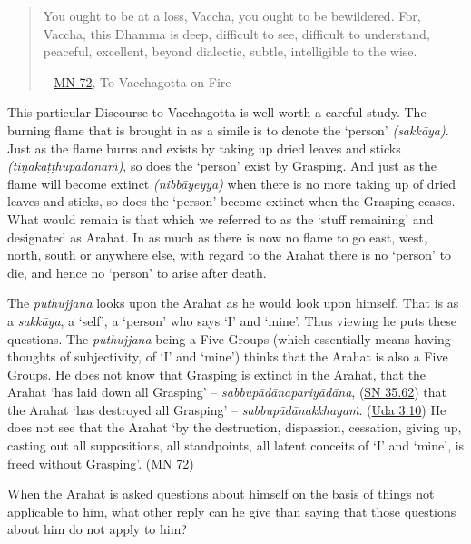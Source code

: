 \begin{quote}
You ought to be at a loss, Vaccha, you ought to be bewildered. For, Vaccha, this Dhamma is deep, difficult to see, difficult to understand, peaceful, excellent, beyond dialectic, subtle, intelligible to the wise.

 -- \href{https://suttacentral.net/mn72/en/thanissaro}{MN 72}, To Vacchagotta on Fire
\end{quote}

This particular Discourse to Vacchagotta is well worth a careful study. The burning flame that is brought in as a simile is to denote the `person' \emph{(sakkāya)}. Just as the flame burns and exists by taking up dried leaves and sticks \emph{(tiṇakaṭṭhupādānaṁ)}, so does the `person' exist by Grasping. And just as the flame will become extinct \emph{(nibbāyeyya)} when there is no more taking up of dried leaves and sticks, so does the `person' become extinct when the Grasping ceases. What would remain is that which we referred to as the `stuff remaining' and designated as Arahat. In as much as there is now no flame to go east, west, north, south or anywhere else, with regard to the Arahat there is no `person' to die, and hence no `person' to arise after death.

The \emph{puthujjana} looks upon the Arahat as he would look upon himself. That is as a \emph{sakkāya}, a `self', a `person' who says `I' and `mine'. Thus viewing he puts these questions. The \emph{puthujjana} being a Five  Groups (which essentially means having thoughts of subjectivity, of `I' and `mine') thinks that the Arahat is also a Five  Groups. He does not know that  Grasping is extinct in the Arahat, that the Arahat `has laid down all Grasping' -- \emph{sabbupādānapariyādāna}, (\href{https://suttacentral.net/sn35.62/en/bodhi}{SN 35.62}) that the Arahat `has destroyed all Grasping' -- \emph{sabbupādānakkhayaṁ}. (\href{https://suttacentral.net/ud3.10/en/anandajoti}{Uda 3.10}) He does not see that the Arahat `by the destruction, dispassion, cessation, giving up, casting out all suppositions, all standpoints, all latent conceits of `I' and `mine', is freed without Grasping'. (\href{https://suttacentral.net/mn72/en/thanissaro}{MN 72})

When the Arahat is asked questions about himself on the basis of things not applicable to him, what other reply can he give than saying that those questions about him do not apply to him?

\clearpage


